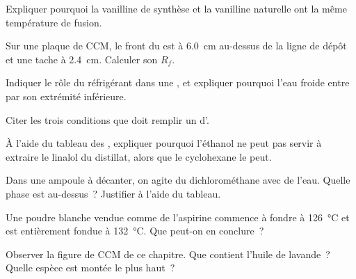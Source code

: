 \begin{exercise}[$\star$]\label{exo:g10:chemical-species:2}
Expliquer pourquoi la vanilline de synthèse et la vanilline naturelle
ont la même température de fusion.
\end{exercise}

\begin{exercise}[$\star$]\label{exo:g10:chemical-species:3}
Sur une plaque de CCM, le front du  est à \qty{6.0}{cm} au-dessus
de la ligne de dépôt et une tache à \qty{2.4}{cm}. Calculer son $R_f$.
\end{exercise}

\begin{exercise}[$\star$]\label{exo:g10:chemical-species:4}
Indiquer le rôle du réfrigérant dans une , et expliquer
pourquoi l'eau froide entre par son extrémité inférieure.
\end{exercise}

\begin{exercise}[$\star$]\label{exo:g10:chemical-species:5}
Citer les trois conditions que doit remplir un  d'.
\end{exercise}

\begin{exercise}[$\star\star$]\label{exo:g10:chemical-species:6}
À l'aide du tableau des , expliquer pourquoi l'éthanol ne peut
pas servir à extraire le linalol du distillat, alors que le cyclohexane
le peut.
\end{exercise}

\begin{exercise}[$\star\star$]\label{exo:g10:chemical-species:7}
Dans une ampoule à décanter, on agite du dichlorométhane avec de l'eau.
Quelle phase est au-dessus~? Justifier à l'aide du tableau.
\end{exercise}

\begin{exercise}[$\star\star$]\label{exo:g10:chemical-species:8}
Une poudre blanche vendue comme de l'aspirine commence à fondre à
\qty{126}{\celsius} et est entièrement fondue à \qty{132}{\celsius}. Que
peut-on en conclure~?
\end{exercise}

\begin{exercise}[$\star\star$]\label{exo:g10:chemical-species:9}
Observer la figure de CCM de ce chapitre. Que contient l'huile de
lavande~? Quelle espèce est montée le plus haut~?
\end{exercise}

